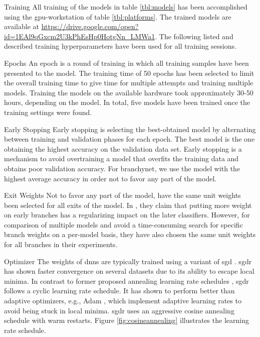 \begin{enumdescript}
	\item[Training] All training of the models in table \ref{tbl:models} has been accomplished using the \gls{gpu}-workstation of table \ref{tbl:platforms}. The trained models are available at {\color{sns-grey}\url{https://drive.google.com/open?id=1EAl9qGxcm2U3kPhEsHp0HotgNn_LMWa1}}.
	The following listed and described training hyperparameters have been used for all training sessions. 
	
	\begin{enumdescript}
		\item[Epochs] An epoch is a round of training in which all training samples have been presented to the model. The training time of 50 epochs has been selected to limit the overall training time to give time for multiple attempts and training multiple models. Training the models on the available hardware took approximately 30-50 hours, depending on the model. In total, five models have been trained once the training settings were found.
		
		\item[Early Stopping] Early stopping is selecting the best-obtained model by alternating between training and validation phases for each epoch. The best model is the one obtaining the highest accuracy on the validation data set. Early stopping is a mechanism to avoid overtraining a model that overfits the training data and obtains poor validation accuracy. For \gls{branchynet}, we use the model with the highest average accuracy in order not to favor any part of the model.  
		
		\item[Exit Weights] Not to favor any part of the model, have the same unit weights been selected for all exits of the model. In \cite{teerapittayanon_branchynet:_2016}, they claim that putting more weight on early branches has a regularizing impact on the later classifiers. However, for comparison of multiple models and avoid a time-consuming search for specific branch weights on a per-model basis, they have also chosen the same unit weights for all branches in their experiments.
		
		\item[Optimizer] The weights of \gls{dnn}s are typically trained using a variant of \gls{sgd} \cite{goodfellow_deep_2016}. \gls{sgdr} \cite{loshchilov_sgdr:_2016} has shown faster convergence on several datasets due to its ability to escape local minima. In contrast to former proposed annealing learning rate schedules \cite{zeiler_adadelta:_2012}, \gls{sgdr} follows a cyclic learning rate schedule. It has shown to perform better than adaptive optimizers, e.g., Adam \cite{kingma_adam:_2014}, which implement adaptive learning rates to avoid being stuck in local minima.  \gls{sgdr} uses an aggressive cosine annealing schedule with warm restarts. Figure \ref{fig:cosineannealing} illustrates the learning rate schedule.
		

\end{enumdescript}
\end{enumdescript}

